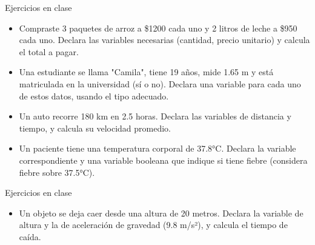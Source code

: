 \documentclass{beamer}
\begin{document}


    \begin{frame}[fragile,t]{Ejercicios en clase}
        \begin{itemize}
            \item Compraste 3 paquetes de arroz a \$1200 cada uno y 2 litros de leche a \$950 cada uno.
            Declara las variables necesarias (cantidad, precio unitario) y calcula el total a pagar.
            \item Una estudiante se llama "Camila", tiene 19 años, mide 1.65 m y está matriculada en la universidad (sí o no). 
            Declara una variable para cada uno de estos datos, usando el tipo adecuado.
            \item Un auto recorre 180 km en 2.5 horas. Declara las variables de distancia y tiempo, y calcula su velocidad promedio.
            \item Un paciente tiene una temperatura corporal de 37.8°C. Declara la variable correspondiente y una variable booleana que indique si tiene fiebre (considera fiebre sobre 37.5°C).
        \end{itemize}
    \end{frame}

    \begin{frame}[fragile,t]{Ejercicios en clase}
        \begin{itemize}
            \item Un objeto se deja caer desde una altura de 20 metros. Declara la variable de altura y la de aceleración de gravedad (9.8 m/s²), y calcula el tiempo de caída.
        \end{itemize}
    \end{frame}
\end{document}
